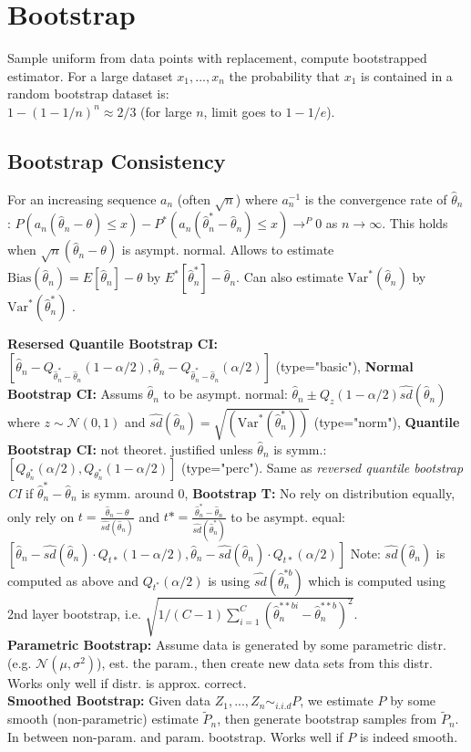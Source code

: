 \section*{Bootstrap}
Sample uniform from data points with replacement, compute bootstrapped estimator. For a large dataset $x_1, ..., x_n$ the probability that $x_1$ is contained in a random bootstrap dataset is: \\
$1-(1-1/n)^n \approx 2/3$ (for large $n$, limit goes to $1-1/e$).
\subsection*{Bootstrap Consistency}
For an increasing sequence $a_n$ (often $\sqrt{n}$) where $a_n^{-1}$ is the convergence rate of $\hat \theta_n$:
$P(a_n(\hat \theta_n - \theta) \leq x) - P^*(a_n(\hat \theta_n^* - \hat \theta_n) \leq x) \to^P 0$ as $n\to \infty$. This holds when $\sqrt{n}(\hat \theta_n - \theta)$ is asympt. normal. Allows to estimate $\text{Bias}(\hat \theta_n) = E[\hat \theta_n] - \theta$ by $E^*[\hat \theta^*_n] - \hat \theta_n$. Can also estimate $\text{Var}^*(\hat\theta_n)$ by $\text{Var}^*(\hat\theta^*_n)$ .

\textbf{Resersed Quantile Bootstrap CI:} $[\hat \theta_n - Q_{\hat{ \theta}_n^* - \hat \theta_n}(1- \alpha / 2), \hat \theta_n - Q_{\hat {\theta}_n^* - \hat \theta_n}(\alpha / 2)]$ (type="basic"), \textbf{Normal Bootstrap CI:} Assums $\hat\theta_n$ to be asympt. normal: $\hat\theta_n \pm Q_z(1-\alpha / 2)\hat{sd}(\hat\theta_n)$ where $z \sim \mathcal{N}(0,1)$ and $\hat{sd}(\hat\theta_n)=\sqrt{({\text{Var}^*(\hat\theta_n^*)})}$ (type="norm"), \textbf{Quantile Bootstrap CI:} not theoret. justified unless $\hat\theta_n$ is symm.:
$[Q_{\theta_n^*}(\alpha / 2), Q_{\theta_n^*}(1-\alpha / 2)]$ (type="perc"). Same as \textit{reversed quantile bootstrap CI} if $\hat\theta_n^* - \hat\theta_n$ is symm. around 0, \textbf{Bootstrap T:} No rely on distribution equally, only rely on $t=\frac{\hat\theta_n -\theta}{\hat {sd}(\hat\theta_n)}$ and $t*=\frac{\hat\theta_n^*-\hat\theta_n}{\hat{sd}(\hat\theta_n^*)}$ to be asympt. equal: $[\hat\theta_n - \hat{sd}(\hat\theta_n) \cdot Q_{t*}(1-\alpha / 2), \hat\theta_n - \hat{sd}(\hat\theta_n) \cdot Q_{t*}(\alpha / 2)]$ Note: $\hat{sd}(\hat\theta_n)$ is computed as above and $Q_{t^*}(\alpha/2)$ is using $\hat{sd}(\hat\theta^{*b}_n)$ which is computed using 2nd layer bootstrap, i.e. $\sqrt{1/(C-1)\sum_{i=1}^C{(\hat{\theta}_n^{**bi}-\hat{\theta}_n^{**b})^2}}$.
\\
\textbf{Parametric Bootstrap:}
Assume data is generated by some parametric distr. (e.g. $\mathcal{N}(\mu, \sigma^2)$), est. the param., 
then create new data sets from this distr. Works only well if distr. is approx. correct.\\
\textbf{Smoothed Bootstrap:}
Given data $Z_1,...,Z_n \sim_{i.i.d} P$, we estimate $P$ by some smooth (non-parametric) estimate $\tilde P_n$, then generate bootstrap samples from $\tilde P_n$. In between non-param. and param. bootstrap. Works well if $P$ is indeed smooth.

